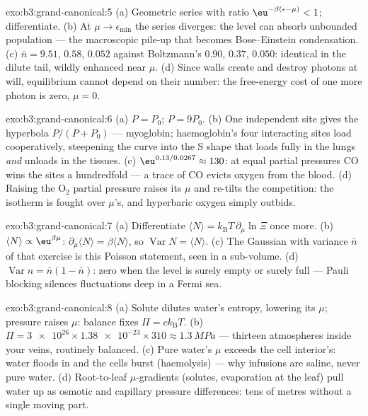 \begin{solution}{exo:b3:grand-canonical:5}
(a) Geometric series with ratio $\eu^{-\beta(\epsilon-\mu)} < 1$;
differentiate. (b) At $\mu \to \epsilon_{\min}$ the series
diverges: the level can absorb unbounded population --- the
macroscopic pile-up that becomes Bose--Einstein condensation. (c)
$\bar n = 9.51$, $0.58$, $0.052$ against Boltzmann's $0.90$,
$0.37$, $0.050$: identical in the dilute tail, wildly enhanced
near $\mu$. (d) Since walls create and destroy photons at will,
equilibrium cannot depend on their number: the free-energy cost of
one more photon is zero, $\mu = 0$.
\end{solution}

\begin{solution}{exo:b3:grand-canonical:6}
(a) $P = P_0$; $P = 9P_0$. (b) One independent site gives the
hyperbola $P/(P + P_0)$ --- myoglobin; haemoglobin's four
interacting sites load cooperatively, steepening the curve into
the S shape that loads fully in the lungs \emph{and} unloads in
the tissues. (c) $\eu^{0.13/0.0267} \approx 130$: at equal partial
pressures CO wins the sites a hundredfold --- a trace of CO
evicts oxygen from the blood. (d) Raising the O$_2$ partial
pressure raises its $\mu$ and re-tilts the competition: the
isotherm is fought over $\mu$'s, and hyperbaric oxygen simply
outbids.
\end{solution}

\begin{solution}{exo:b3:grand-canonical:7}
(a) Differentiate $\langle N\rangle = k_{\text{B}}T\,\partial_\mu
\ln\Xi$ once more. (b) $\langle N\rangle \propto
\eu^{\beta\mu}$: $\partial_\mu\langle N\rangle = \beta\langle
N\rangle$, so $\operatorname{Var}N = \langle N\rangle$. (c) The
Gaussian with variance $\bar n$ of that exercise is this Poisson
statement, seen in a sub-volume. (d) $\operatorname{Var}n =
\bar n(1 - \bar n)$: zero when the level is surely empty or surely
full --- Pauli blocking silences fluctuations deep in a Fermi sea.
\end{solution}

\begin{solution}{exo:b3:grand-canonical:8}
(a) Solute dilutes water's entropy, lowering its $\mu$; pressure
raises $\mu$: balance fixes $\Pi = ck_{\text{B}}T$. (b) $\Pi =
\num{3e26} \times \num{1.38e-23} \times 310 \approx
\qty{1.3}{MPa}$ --- thirteen atmospheres inside your veins,
routinely balanced. (c) Pure water's $\mu$ exceeds the cell
interior's: water floods in and the cells burst (haemolysis) ---
why infusions are saline, never pure water. (d) Root-to-leaf
$\mu$-gradients (solutes, evaporation at the leaf) pull water up
as osmotic and capillary pressure differences: tens of metres
without a single moving part.
\end{solution}

